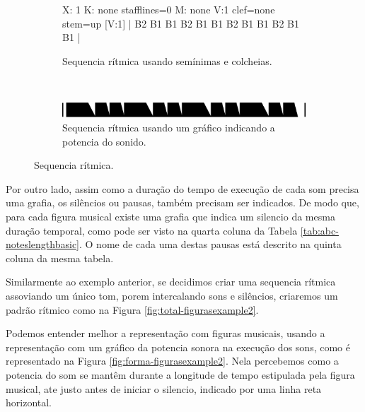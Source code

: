 \begin{figure}[h]
    \centering
    \begin{subfigure}[b]{0.9\textwidth}
 \begin{abc}[name=abc-figurasexample1]
%
X: 1 %
K: none stafflines=0 %
M:  none %
V:1 clef=none stem=up %
%
[V:1] | B2 B1 B1 B2 B1 B1 B2 B1 B1 B2  B1 B1   |
%       
\end{abc}
	\caption{Sequencia rítmica usando semínimas e colcheias.}
	\label{fig:abc-figurasexample1}
    \end{subfigure}
    ~%
    \begin{subfigure}[b]{0.9\textwidth}
        \includegraphics[width=\textwidth]{chapters/cap-musica-basica/forma-figurasexample1.eps}
        \caption{Sequencia rítmica usando um gráfico indicando a potencia do sonido.}
        \label{fig:forma-figurasexample1b}
    \end{subfigure}
    \caption{Sequencia rítmica.}\label{fig:total-figurasexample1}
\end{figure}


Por outro lado, assim como a duração do tempo de execução de cada som precisa uma grafia,
os silêncios ou pausas, também precisam ser indicados. 
De modo que, para cada figura musical existe uma grafia que indica um silencio da mesma duração temporal,
como pode ser visto na quarta coluna da Tabela \ref{tab:abc-noteslengthbasic}.
O nome de cada uma destas pausas está descrito na quinta coluna da mesma tabela.

\begin{example}
Similarmente ao exemplo anterior, se decidimos criar uma sequencia rítmica assoviando um único tom, porem
intercalando sons e silêncios, criaremos um padrão rítmico como na Figura \ref{fig:total-figurasexample2}.

Podemos entender melhor a representação com figuras musicais, 
usando a representação com um gráfico da potencia sonora na execução dos sons,
como é representado na Figura \ref{fig:forma-figurasexample2}.
Nela percebemos como a potencia do som se mantêm durante a longitude de tempo estipulada pela figura musical, 
ate justo antes de iniciar o silencio, indicado por uma linha reta horizontal.
\end{example} 

